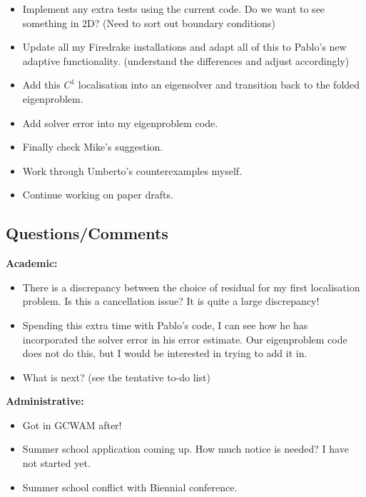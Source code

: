 \documentclass[12pt,a4paper]{article}
\begin{document}
\begin{itemize}
    \item Implement any extra tests using the current code. Do we want to see something in 2D? (Need to sort out boundary conditions)
    \item Update all my Firedrake installations and adapt all of this to Pablo's new adaptive functionality. (understand the differences and adjust accordingly)
    \item Add this $C^1$ localisation into an eigensolver and transition back to the folded eigenproblem. 
    \item Add solver error into my eigenproblem code. 
    \item Finally check Mike's suggestion.
    \item Work through Umberto's counterexamples myself. 
    \item Continue working on paper drafts. 
\end{itemize}

\subsection{Questions/Comments}

\textbf{Academic:}

\begin{itemize}
    \item There is a discrepancy between the choice of residual for my first localisation problem. Is this a cancellation issue? It is quite a large discrepancy!
    \item Spending this extra time with Pablo's code, I can see how he has incorporated the solver error in his error estimate. Our eigenproblem code does not do this, but I would be interested in trying to add it in. 
    \item What is next? (see the tentative to-do list)
\end{itemize}

\textbf{Administrative:}

\begin{itemize}
    \item Got in GCWAM after! 
    \item Summer school application coming up. How much notice is needed? I have not started yet. 
    \item Summer school conflict with Biennial conference. 
\end{itemize}
\end{document}
